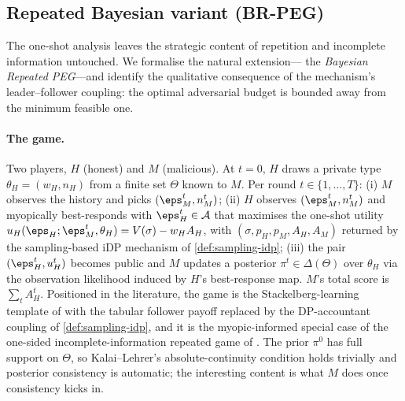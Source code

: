\subsection{Repeated Bayesian variant (BR-PEG)}
\label{sec:br-peg}

The one-shot analysis leaves the strategic content of repetition and
incomplete information untouched. We formalise the natural extension---
the \emph{Bayesian Repeated PEG}---and identify the qualitative
consequence of the mechanism's leader--follower coupling: the optimal
adversarial budget is bounded away from the minimum feasible one.

\paragraph{The game.}
Two players, $H$ (honest) and $M$ (malicious). At $t=0$, $H$ draws a
private type $\theta_H = (w_H, n_H)$ from a finite set $\Theta$ known
to $M$. Per round $t \in \{1,\dots,T\}$: (i) $M$ observes the history
and picks $(\eps_M^t, n_M^t)$; (ii) $H$ observes $(\eps_M^t, n_M^t)$
and myopically best-responds with $\eps_H^t \in \mathcal{A}$ that
maximises the one-shot utility $u_H(\eps_H; \eps_M^t, \theta_H) =
V(\sigma) - w_H A_H$, with $(\sigma, p_H, p_M, A_H, A_M)$ returned by
the sampling-based iDP mechanism of \cref{def:sampling-idp}; (iii) the
pair $(\eps_H^t, u_H^t)$ becomes public and $M$ updates a posterior
$\pi^t \in \Delta(\Theta)$ over $\theta_H$ via the observation
likelihood induced by $H$'s best-response map. $M$'s total score is
$\sum_t A_H^t$. Positioned in the literature, the game is the
Stackelberg-learning template of \citet{letchford2009learning,
blum2014learning, balcan2015commitment} with the tabular follower
payoff replaced by the DP-accountant coupling of
\cref{def:sampling-idp}, and it is the myopic-informed special case of
the one-sided incomplete-information repeated game of
\citet{aumann1995repeated}. The prior $\pi^0$ has full support on
$\Theta$, so Kalai--Lehrer's absolute-continuity condition holds
trivially and posterior consistency is automatic; the interesting
content is what $M$ does once consistency kicks in.

